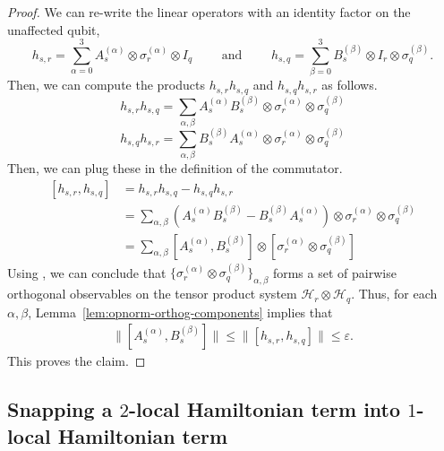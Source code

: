 \documentclass[a4paper,onecolumn,11pt]{quantumarticle}
\theoremstyle{plain}
\newcommand{\eps}{\varepsilon}
\begin{document}
\begin{proof}
We can re-write the linear operators with an identity factor on the unaffected qubit,
    \begin{equation}
        h_{s,r} = \sum\limits_{\alpha = 0}^{3} A_s^{(\alpha)} \otimes \sigma_r^{(\alpha)} \otimes I_{q}\quad\quad\text{ and } \quad\quad h_{s,q} = \sum\limits_{\beta = 0}^{3} B_s^{(\beta)} \otimes I_r \otimes \sigma_q^{(\beta)}.
    \end{equation}
Then, we can compute the products $h_{s,r} h_{s,q}$ and $h_{s,q} h_{s,r}$ as follows.
\begin{equation}
    h_{s,r} h_{s,q} = \sum\limits_{\alpha, \beta} A_s^{(\alpha)} B_s^{(\beta)} \otimes \sigma_r^{(\alpha)} \otimes \sigma_q^{(\beta)}
\end{equation}
\begin{equation}
    h_{s,q} h_{s,r} = \sum\limits_{\alpha, \beta}  B_s^{(\beta)} A_s^{(\alpha)} \otimes \sigma_r^{(\alpha)} \otimes \sigma_q^{(\beta)}
\end{equation}
Then, we can plug these in the definition of the commutator.
\begin{align*}
    \left[h_{s,r}, h_{s,q}\right] &= h_{s,r} h_{s,q} - h_{s,q} h_{s,r}\\
    &= \sum\limits_{\alpha, \beta} \left(A_s^{(\alpha)} B_s^{(\beta)} - B_s^{(\beta)} A_s^{(\alpha)}\right) \otimes \sigma_r^{(\alpha)} \otimes \sigma_q^{(\beta)}\\
    &= \sum\limits_{\alpha, \beta} \left[A_s^{(\alpha)}, B_s^{(\beta)} \right] \otimes \left[\sigma_r^{(\alpha)} \otimes \sigma_q^{(\beta)}\right]
\end{align*}
Using , we can conclude that $\{\sigma_r^{(\alpha)} \otimes \sigma_q^{(\beta)}\}_{\alpha,\beta}$ forms a set of pairwise orthogonal observables on the tensor product system $\mathcal{H}_r \otimes \mathcal{H}_q$. Thus, for each $\alpha, \beta$, Lemma~\ref{lem:opnorm-orthog-components} implies that 
\begin{align}
\|[A_s^{(\alpha)}, B_s^{(\beta)}]\| \leq \|[h_{s, r}, h_{s, q}]\| \leq \eps.
\end{align}
This proves the claim.
\end{proof}

\subsection{Snapping a $2$-local Hamiltonian term into $1$-local Hamiltonian term}
\end{document}
